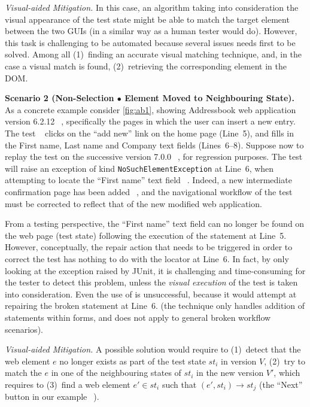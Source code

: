 \noindent
\textit{Visual-aided Mitigation.}
In this case, an algorithm taking into consideration the visual appearance of the test state might be able to match the target element between the two GUIs (in a similar way as a human tester would do). However, this task is challenging to be automated because several issues needs first to be solved. Among all (1)~finding an accurate visual matching technique, and, in the case a visual match is found, (2)~retrieving the corresponding element in the DOM. 

\noindent
\textbf{Scenario 2 (Non-Selection $\bullet$ Element Moved to Neighbouring State).}
As a concrete example consider \autoref{fig:ab1}, showing Addressbook web application version 6.2.12~\textcircled{}, specifically the pages in which the user can insert a new entry. The test~\textcircled{} clicks on the ``add new'' link on the home page (Line~5), and fills in the First name, Last name and Company text fields (Lines~6--8).
Suppose now to replay the test on the successive version 7.0.0~\textcircled{}, for regression purposes. The test will raise an exception of kind \texttt{NoSuchElementException} at Line~6, when attempting to locate the ``First name'' text field~\textcircled{}. 
Indeed, a new intermediate confirmation page has been added~\textcircled{}, and the navigational workflow of the test must be corrected to reflect that of the new modified web application.

From a testing perspective, the ``First name'' text field can no longer be found on the web page (test state) following the execution of the statement at Line~5. However, conceptually, the repair action that needs to be triggered in order to correct the test has nothing to do with the locator at Line~6.
In fact, by only looking at the exception raised by JUnit, it is  challenging and time-consuming for the tester to detect this problem, unless the \textit{visual execution} of the test is taken into consideration.
%
Even the use of \water is unsuccessful, because it would attempt at repairing the broken statement at Line~6. (the technique only handles addition of statements within forms, and does not apply to general broken workflow scenarios).

\noindent
\textit{Visual-aided Mitigation.}
A possible solution would require to (1)~detect that the web element $e$ no longer exists as part of the test state $st_i$ in version $V$, (2)~try to match the $e$ in one of the neighbouring states of $st_i$ in the new version $V'$, which requires to (3)~find  a web element $e' \in st_i$ such that $(e', st_i) \rightarrow st_j$ (the ``Next'' button in our example~\textcircled{}).

